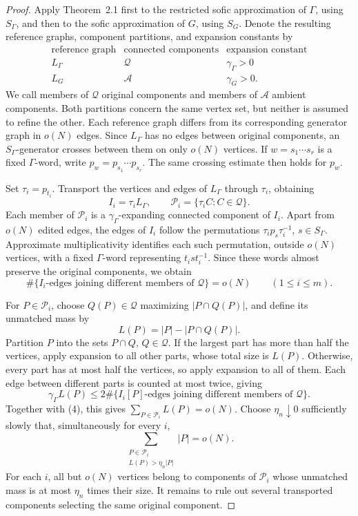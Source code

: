 \documentclass[10pt]{article}
\newcommand{\abs}[1]{\left|#1\right|}
\begin{document}
\begin{proof}
Apply Theorem~2.1 first to the restricted sofic approximation of $\Gamma$, using $S_\Gamma$, and then to the sofic approximation of $G$, using $S_G$. Denote the resulting reference graphs, component partitions, and expansion constants by
\[
\begin{array}{c|c|c}
\text{reference graph}&\text{connected components}&\text{expansion constant}\\ \hline
L_\Gamma&\mathcal Q&\gamma_\Gamma>0\\
L_G&\mathcal A&\gamma_G>0.
\end{array}
\]
We call members of $\mathcal Q$ original components and members of $\mathcal A$ ambient components. Both partitions concern the same vertex set, but neither is assumed to refine the other. Each reference graph differs from its corresponding generator graph in $o(N)$ edges. Since $L_\Gamma$ has no edges between original components, an $S_\Gamma$-generator crosses between them on only $o(N)$ vertices. If $w=s_1\cdots s_r$ is a fixed $\Gamma$-word, write $p_w=p_{s_1}\cdots p_{s_r}$. The same crossing estimate then holds for $p_w$.

Set $\tau_i=p_{t_i}$. Transport the vertices and edges of $L_\Gamma$ through $\tau_i$, obtaining
\[
I_i=\tau_iL_\Gamma,\qquad \mathcal P_i=\{\tau_iC:C\in\mathcal Q\}.
\]
Each member of $\mathcal P_i$ is a $\gamma_\Gamma$-expanding connected component of $I_i$. Apart from $o(N)$ edited edges, the edges of $I_i$ follow the permutations $\tau_ip_s\tau_i^{-1}$, $s\in S_\Gamma$. Approximate multiplicativity identifies each such permutation, outside $o(N)$ vertices, with a fixed $\Gamma$-word representing $t_ist_i^{-1}$. Since these words almost preserve the original components, we obtain
\begin{equation}
\#\{I_i\text{-edges joining different members of }\mathcal Q\}=o(N)\qquad(1\leq i\leq m).
\tag{4}
\end{equation}

For $P\in\mathcal P_i$, choose $Q(P)\in\mathcal Q$ maximizing $\abs{P\cap Q(P)}$, and define its unmatched mass by
\[
L(P)=\abs{P}-\abs{P\cap Q(P)}.
\]
Partition $P$ into the sets $P\cap Q$, $Q\in\mathcal Q$. If the largest part has more than half the vertices, apply expansion to all other parts, whose total size is $L(P)$. Otherwise, every part has at most half the vertices, so apply expansion to all of them. Each edge between different parts is counted at most twice, giving
\[
\gamma_\Gamma L(P)\leq2\#\{I_i[P]\text{-edges joining different members of }\mathcal Q\}.
\]
Together with (4), this gives $\sum_{P\in\mathcal P_i}L(P)=o(N)$. Choose $\eta_n\downarrow0$ sufficiently slowly that, simultaneously for every $i$,
\begin{equation}
\sum_{\substack{P\in\mathcal P_i\\L(P)>\eta_n\abs{P}}}\abs{P}=o(N).
\tag{5}
\end{equation}
For each $i$, all but $o(N)$ vertices belong to components of $\mathcal P_i$ whose unmatched mass is at most $\eta_n$ times their size. It remains to rule out several transported components selecting the same original component.


\end{proof}
\end{document}
